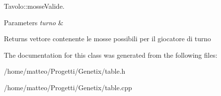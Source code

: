 Tavolo\+::mosse\+Valide. 


\begin{DoxyParams}{Parameters}
{\em turno} & \\
\hline
\end{DoxyParams}
\begin{DoxyReturn}{Returns}
vettore contenente le mosse possibili per il giocatore di turno 
\end{DoxyReturn}


The documentation for this class was generated from the following files\+:\begin{DoxyCompactItemize}
\item 
/home/matteo/\+Progetti/\+Genetix/table.\+h\item 
/home/matteo/\+Progetti/\+Genetix/table.\+cpp\end{DoxyCompactItemize}
